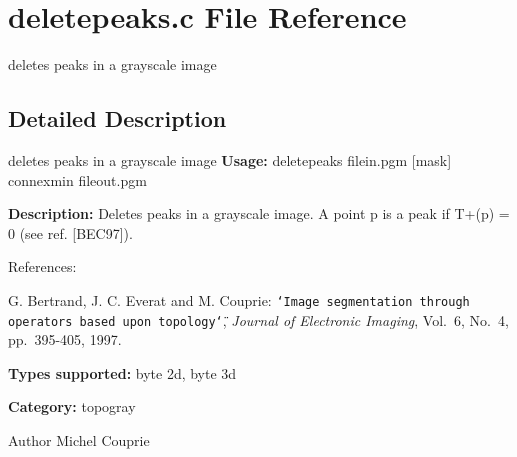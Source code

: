\section{deletepeaks.c File Reference}
\label{deletepeaks_8c}


deletes peaks in a grayscale image  




\subsection{Detailed Description}
deletes peaks in a grayscale image {\bfseries Usage:} deletepeaks filein.pgm [mask] connexmin fileout.pgm

{\bfseries Description:} Deletes peaks in a grayscale image. A point p is a peak if T+(p) = 0 (see ref. [BEC97]).

References:\par
 [BEC97] G. Bertrand, J. C. Everat and M. Couprie: {\tt \char`\"{}Image segmentation through operators based upon topology\char`\"{}}, {\itshape  Journal of Electronic Imaging\/}, Vol.~6, No.~4, pp.~395-\/405, 1997.\par


{\bfseries Types supported:} byte 2d, byte 3d

{\bfseries Category:} topogray

\begin{DoxyAuthor}{Author}
Michel Couprie 
\end{DoxyAuthor}
